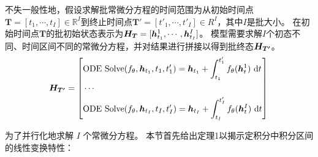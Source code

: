 不失一般性地，假设求解批常微分方程的时间范围为从初始时间点$\boldsymbol{T} = [t_1, \cdots,t_I]\in \mathbb{R}^I$到终止时间点$\boldsymbol{T'} = [t' _1, \cdots, t' _I]\in R^I$，其中$I$是批大小。
在初始时间点$\boldsymbol{T}$的批初始状态表示为${\boldsymbol{H}}_{\boldsymbol{T}}=[\boldsymbol{h}_{t_1}^1,\cdots,\boldsymbol{h}_{t_I}^I]$。
模型需要求解$I$个初态不同、时间区间不同的常微分方程，并对结果进行拼接以得到批终态${\boldsymbol{H}}_{\boldsymbol{T'}}$。
\begin{equation}
    \boldsymbol{H}_{\boldsymbol{T'}} = 
    \left[
    \begin{aligned}
  &\text{ODE Solve}(f_\theta, \boldsymbol{h}_{t_1}, t_1, t'_1) = \boldsymbol{h}_{t_1} + \int_{t_{1}}^{t'_1}f_{\theta}(\boldsymbol h^1_t) \mathrm{~d}t\\
  &\cdots\\
  &\text{ODE Solve}(f_\theta,\boldsymbol{h}_{t_I}, t_I, t'_I) = \boldsymbol{h}_{t_I} + \int_{t_{I}}^{t'_{I}}f_{\theta}(\boldsymbol h^I_t)\mathrm{~d}t 
  \end{aligned}
    \right]\\
    \label{equ:solve_all_ode}
\end{equation}

为了并行化地求解 $I$ 个常微分方程。
本节首先给出定理1以揭示定积分中积分区间的线性变换特性：

